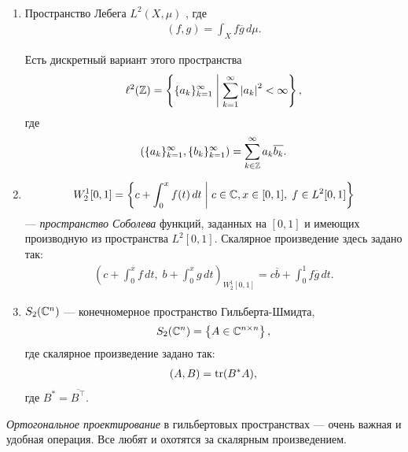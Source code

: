 \documentclass[../complex-analysis.tex]{subfiles}
\begin{document}
\begin{exmpl}\
\begin{enumerate}
 \item Пространство Лебега $ L^{2}(X,\mu) $ , где
  \begin{align*}
   (f,g) = \int_{X} f\overline g\,d\mu. 
  \end{align*}

  Есть дискретный вариант этого пространства
   \begin{align*}
   \ell^{2}(\mathbb{Z}) = \left\{ \{a_{k}\}_{k=1}^{\infty} \;\middle|\; \sum_{k=1}^{\infty}\left| a_k \right|^{2} < \infty  \right\},
  \end{align*} где
  \begin{align*}
   \left( \{a_{k}\}_{k=1}^{\infty}, \{b_{k}\}_{k=1}^{\infty}   \right) = \sum_{k \in\mathbb{Z}}^{\infty} a_k \overline{b_k}.
  \end{align*}
 \item 
  \begin{align*}
   W_2^{1} [0,1] = \left\{ c + \int_{0}^{x} f(t)\,dt \;\middle|\; c \in \mathbb{C}, x \in [0,1],\; f \in L^{2}[0,1] \right\}
  \end{align*} --- \textit{пространство Соболева} функций, заданных на $ [0,1] $ и имеющих производную из пространства $ L^{2}[0,1] $. Скалярное произведение здесь задано так:
  \begin{align*}
   \left( c + \int_{0}^{x} f\,dt,\; b + \int_{0}^{x} g\,dt \right)_{W_2^{1}[0,1]} = c \overline b + \int_{0}^{1} f\overline g\,dt.
  \end{align*}

 \item $ S_2(\mathbb{C}^{n}) $ --- конечномерное пространство Гильберта-Шмидта,
  \begin{align*}
   S_2(\mathbb{C}^{n}) = \left\{ A \in \mathbb{C}^{n \times n} \right\},
  \end{align*} где скалярное произведение задано так:
  \begin{align*}
   (A,B) = \operatorname{tr} (B^{\ast}A),
  \end{align*} где $ B^{\ast} = \overline{B^{\top}} $.
\end{enumerate} 
\end{exmpl}

\textit{Ортогональное проектирование} в гильбертовых пространствах --- очень важная и удобная операция. Все любят и охотятся за скалярным произведением.
\end{document}
